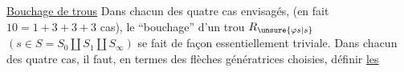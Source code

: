 \uline{Bouchage de trous} Dans chacun des quatre cas envisagés, (en fait $10=1+3+3+3$ cas), le ``bouchage'' d'un trou $R_{\unsure{\varphi s|s}}$ $(s\in S=S_0\amalg S_1\amalg S_\infty)$ se fait de façon essentiellement triviale. Dans chacun des quatre cas, il faut, en termes des flèches génératrices choisies, définir \uline{les}

